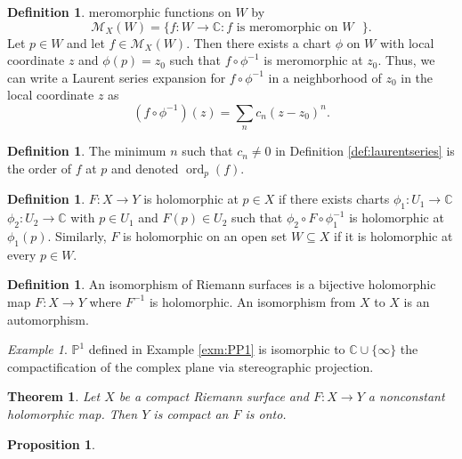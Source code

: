 \documentclass{dcthesis}
\newcommand{\PP}{\mathbb P}
\newcommand{\CC}{\mathbb C}
\newcommand{\defi}[1]{\textsf{#1}}
\DeclareMathOperator{\ord}{ord}
\numberwithin{equation}{section}
\newtheorem{theorem}[equation]{Theorem}
\newtheorem{prop}[equation]{Proposition}
\theoremstyle{definition}
\newtheorem{definition}[equation]{Definition}
\theoremstyle{remark}
\newtheorem{example}[equation]{Example}
\begin{document}
{{\begin{definition}
      meromorphic functions on $W$ by
      \[
        \mathcal{M}_X(W)
        =
        \{f\colon W\to\CC : f\text{ is meromorphic on $W$ }\}.
      \]
      Let $p\in W$ and
      let $f\in\mathcal{M}_X(W)$.
      Then there exists a chart $\phi$ on $W$
      with local coordinate $z$
      and
      $\phi(p) = z_0$
      such that $f\circ\phi^{-1}$ is meromorphic at $z_0$.
      Thus,
      we can write a \defi{Laurent series expansion
      for $f\circ\phi^{-1}$}
      in a neighborhood of $z_0$
      in the local coordinate $z$
      as
      \[
        (f\circ\phi^{-1})(z) = \sum_{n}c_n(z-z_0)^n.
      \]
    \end{definition}
    \begin{definition}
      \label{def:ord}
      The minimum $n$ such that $c_n\neq 0$
      in Definition \ref{def:laurentseries}
      is the \defi{order of $f$ at $p$}
      and denoted
      $\ord_p(f)$.
    \end{definition}
    \begin{definition}
      \label{ref:holomorphicmapofRS}
      $F\colon X\to Y$ is
      \defi{holomorphic}
      at $p\in X$
      if there exists
      charts
      $\phi_1\colon U_1\to\CC$
      $\phi_2\colon U_2\to\CC$
      with $p\in U_1$ and $F(p)\in U_2$
      such that
      $\phi_2\circ F\circ\phi_1^{-1}$
      is holomorphic at $\phi_1(p)$.
      Similarly,
      $F$ is \defi{holomorphic on an open set $W\subseteq X$}
      if it is holomorphic at every $p\in W$.
    \end{definition}
    \begin{definition}
      \label{def:RSautoiso}
      An \defi{isomorphism} of Riemann surfaces is
      a bijective holomorphic map $F\colon X\to Y$
      where $F^{-1}$ is holomorphic.
      An isomorphism from $X$ to $X$ is
      an \defi{automorphism}.
    \end{definition}
    \begin{example}
      \label{exm:PP1isoCCoo}
      $\PP^1$ defined in Example
      \ref{exm:PP1}
      is isomorphic to $\CC\cup \{\infty\}$
      the compactification of the complex plane
      via stereographic projection.
    \end{example}
    \begin{theorem}
      \label{thm:compactonto}
      Let $X$ be a compact Riemann surface
      and $F\colon X\to Y$
      a nonconstant holomorphic map.
      Then $Y$ is compact an $F$ is onto.
    \end{theorem}
    \begin{prop}

\end{prop}}}
\end{document}
